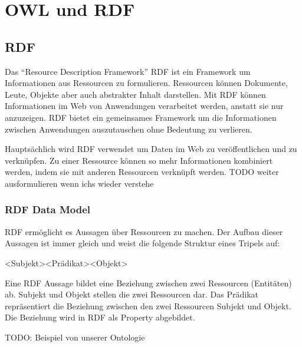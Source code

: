 \chapter{OWL und RDF}
\label{chap:owl_Rdf}

\section{RDF}
\label{sec:owlRdf_rdf}

Das "`Resource Description Framework"' RDF ist ein Framework um Informationen aus Ressourcen zu formulieren. Ressourcen können Dokumente, Leute, Objekte aber auch abstrakter Inhalt darstellen. Mit RDF können Informationen im Web von Anwendungen verarbeitet werden, anstatt sie nur anzuzeigen. RDF bietet ein gemeinsames Framework um die Informationen zwischen Anwendungen auszutauschen ohne Bedeutung zu verlieren. 

Hauptsächlich wird RDF verwendet um Daten im Web zu veröffentlichen und zu verknüpfen. Zu einer Ressource können so mehr Informationen kombiniert werden, indem sie mit anderen Ressourcen verknüpft werden. 
TODO weiter ausformulieren wenn ichs wieder verstehe

\subsection{RDF Data Model}
\label{sec:owlRdf_rdf_dataModel}
RDF ermöglicht es Aussagen über Ressourcen zu machen. Der Aufbau dieser Aussagen ist immer gleich und weist die folgende Struktur eines Tripels auf:

\noindent\hspace*{15mm}<Subjekt><Prädikat><Objekt>

Eine RDF Aussage bildet eine Beziehung zwischen zwei Ressourcen (Entitäten) ab. 
Subjekt und Objekt stellen die zwei Ressourcen dar. Das Prädikat repräsentiert die Beziehung zwischen den zwei Ressourcen Subjekt und Objekt. Die Beziehung wird in RDF als Property abgebildet. 
 
TODO: Beispiel von unserer Ontologie



